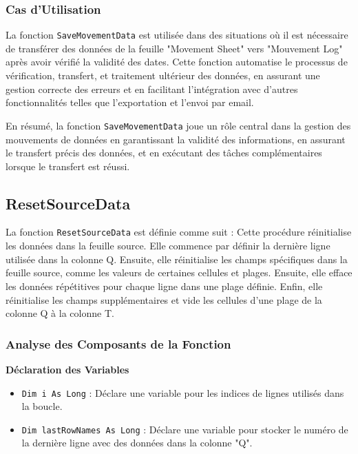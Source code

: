 \documentclass[a4paper, oneside, 12pt, final]{extreport}
\begin{document}
\subsubsection{Cas d'Utilisation}

La fonction \texttt{SaveMovementData} est utilisée dans des situations où il est nécessaire de transférer des données de la feuille "Movement Sheet" vers "Mouvement Log" après avoir vérifié la validité des dates. Cette fonction automatise le processus de vérification, transfert, et traitement ultérieur des données, en assurant une gestion correcte des erreurs et en facilitant l'intégration avec d'autres fonctionnalités telles que l'exportation et l'envoi par email.

En résumé, la fonction \texttt{SaveMovementData} joue un rôle central dans la gestion des mouvements de données en garantissant la validité des informations, en assurant le transfert précis des données, et en exécutant des tâches complémentaires lorsque le transfert est réussi.
\subsection{ ResetSourceData}

La fonction \texttt{ResetSourceData} est définie comme suit :
Cette procédure réinitialise les données dans la feuille source. Elle commence par définir la dernière ligne utilisée dans la colonne Q. Ensuite, elle réinitialise les champs spécifiques dans la feuille source, comme les valeurs de certaines cellules et plages. Ensuite, elle efface les données répétitives pour chaque ligne dans une plage définie. Enfin, elle réinitialise les champs supplémentaires et vide les cellules d'une plage de la colonne Q à la colonne T.

\subsubsection{Analyse des Composants de la Fonction}

\textbf{Déclaration des Variables}

\begin{itemize}
    \item \texttt{Dim i As Long} : Déclare une variable pour les indices de lignes utilisés dans la boucle.
    \item \texttt{Dim lastRowNames As Long} : Déclare une variable pour stocker le numéro de la dernière ligne avec des données dans la colonne "Q".
\end{itemize}
\end{document}
